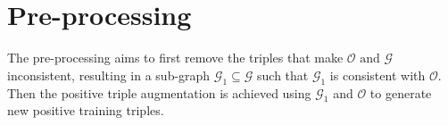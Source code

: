 \documentclass[sigconf]{acmart}
\begin{document}
\section{Pre-processing}
\label{sect:preprocessing}

The pre-processing    aims to first remove the triples that make $\mathcal{O} \text{ and } \mathcal{G}$ inconsistent, resulting in a sub-graph $\mathcal{G}_1 \subseteq \mathcal{G}$ such that $\mathcal{G}_1$ is consistent with $\mathcal{O}$. Then the positive triple augmentation  is achieved using $\mathcal{G}_1$ and $\mathcal{O}$   to generate new positive training triples. 




\end{document}
